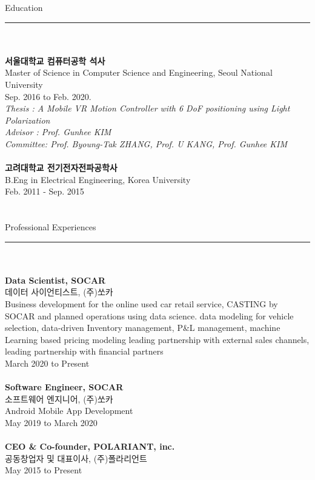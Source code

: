 \documentclass[letterpaper,11pt,oneside]{article}
\begin{document}
\noindent 
 \Large{Education}   \\ 
\noindent\rule{8cm}{0.4pt}\\
 \\
\normalsize\textbf{서울대학교 컴퓨터공학 석사} \\
Master of Science in Computer Science and Engineering, Seoul National University \\
Sep. 2016 to Feb. 2020. \\
\emph{Thesis : A Mobile VR Motion Controller with 6 DoF positioning using Light Polarization} \\
\emph{Advisor : Prof. Gunhee KIM} \\
\emph{Committee: Prof. Byoung-Tak ZHANG, Prof. U KANG, Prof. Gunhee KIM}
\\
\\
\textbf{고려대학교 전기전자전파공학사} \\
B.Eng in Electrical Engineering, Korea University \\ 
Feb. 2011 - Sep. 2015 \\
\\
\\
 \Large{Professional Experiences}   \\
 \noindent\rule{8cm}{0.4pt}\\
 \\
 \normalsize\textbf{{Data Scientist}, SOCAR} \\
 데이터 사이언티스트, (주)쏘카 \\
 Business development for the online used car retail service, CASTING by SOCAR and planned operations using data science. data modeling for vehicle selection, data-driven Inventory management, P\&L management, machine Learning based pricing modeling leading partnership with external sales channels, leading partnership with financial partners \\
March 2020 to Present \\
 \\
 \normalsize\textbf{{Software Engineer}, SOCAR} \\
 소프트웨어 엔지니어, (주)쏘카 \\
Android Mobile App Development \\
May 2019 to March 2020 \\
\\
\textbf{{CEO \& Co-founder}, POLARIANT, inc.} \\
공동창업자 및 대표이사, (주)폴라리언트 \\
May 2015 to Present \\
\end{document}
